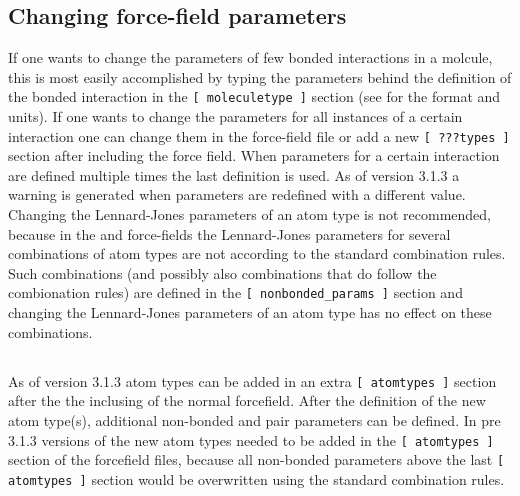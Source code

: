 \subsection{Changing force-field parameters
}
If one wants to change the parameters of few bonded interactions in
a molcule, this is most easily accomplished by typing the parameters
behind the definition of the bonded interaction in the
{\tt [ moleculetype ]} section (see  for the format
and units).
If one wants to change the parameters for all instances of a certain
interaction one can change them in the force-field file or add a
new {\tt [ ???types ]} section after including the force field.
When parameters for a certain interaction are defined multiple times
the last definition is used. As of {\gromacs} version 3.1.3 a warning is
generated when parameters are redefined with a different value.
Changing the Lennard-Jones parameters of an atom type is not
recommended, because in the {\gromacs} and {\gromos} force-fields
the Lennard-Jones parameters for several combinations of atom types
are not according to the standard combination rules.
Such combinations (and possibly also combinations that do follow the
combionation rules) are defined in the {\tt [ nonbonded\_params ]}
section and changing the Lennard-Jones parameters of an atom type
has no effect on these combinations.

\subsection{}
As of {\gromacs} version 3.1.3 atom types can be added in an extra
{\tt [ atomtypes ]} section after the the inclusing of the normal
forcefield. After the definition of the new atom type(s), additional
non-bonded and pair parameters can be defined.
In pre 3.1.3 versions of {\gromacs} the new atom types needed to be
added in the {\tt [ atomtypes ]} section of the forcefield files,
because all non-bonded parameters above the last {\tt [ atomtypes ]}
section would be overwritten using the standard combination rules.
